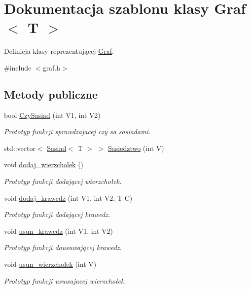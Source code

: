 \hypertarget{class_graf}{\section{\-Dokumentacja szablonu klasy \-Graf$<$ \-T $>$}
\label{class_graf}
}


\-Definicja klasy reprezentującej \hyperlink{class_graf}{\-Graf}.  




{\ttfamily \#include $<$graf.\-h$>$}

\subsection*{\-Metody publiczne}
\begin{DoxyCompactItemize}
\item 
bool \hyperlink{class_graf_a01861cca27929e19cff4afa6193dd0be}{\-Czy\-Sasiad} (int \-V1, int \-V2)
\begin{DoxyCompactList}\small\item\em \-Prototyp funkcji sprawdzajacej czy sa sasiadami. \end{DoxyCompactList}\item 
std\-::vector$<$ \hyperlink{class_sasiad}{\-Sasiad}$<$ \-T $>$ $>$ \hyperlink{class_graf_aa76ff60cadbe258042e4c58af1719ad8}{\-Sasiedztwo} (int \-V)
\item 
void \hyperlink{class_graf_a40ce58fbf1a20123da855ac6f2fe9fc3}{dodaj\-\_\-wierzcholek} ()
\begin{DoxyCompactList}\small\item\em \-Prototyp funkcji dodającej wierzchołek. \end{DoxyCompactList}\item 
void \hyperlink{class_graf_a84371428934edef93a783ee6a8fac0a5}{dodaj\-\_\-krawedz} (int \-V1, int \-V2, \-T \-C)
\begin{DoxyCompactList}\small\item\em \-Prototyp funkcji dodającej krawedz. \end{DoxyCompactList}\item 
void \hyperlink{class_graf_a46ddf0b86582f28a5dfa57348799ed9b}{usun\-\_\-krawedz} (int \-V1, int \-V2)
\begin{DoxyCompactList}\small\item\em \-Prototyp funkcji dousuwającej krawedz. \end{DoxyCompactList}\item 
void \hyperlink{class_graf_a87147813c1c05b9f9cd35a9eb4cef738}{usun\-\_\-wierzcholek} (int \-V)
\begin{DoxyCompactList}\small\item\em \-Prototyp funkcji usuwajacej wierzchołek. \end{DoxyCompactList}\end{DoxyCompactItemize}
